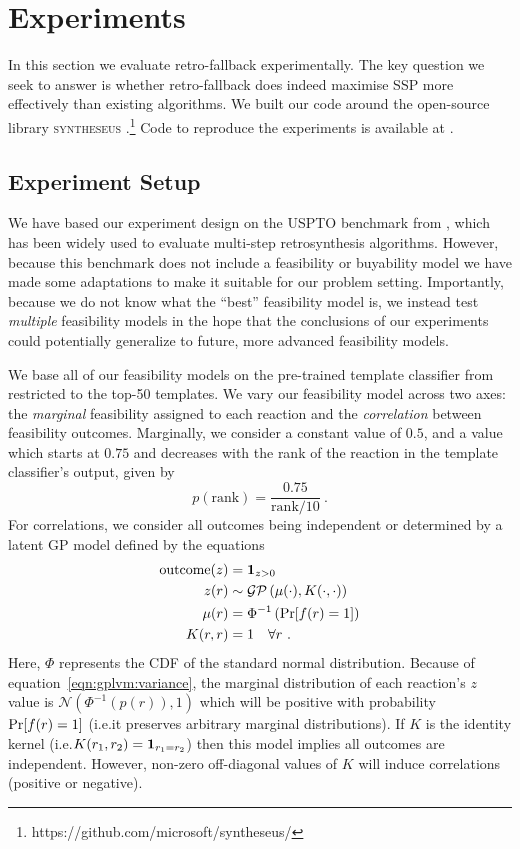 \section{Experiments}\label{sec:rfb:experiments}

In this section we evaluate retro-fallback experimentally.
The key question we seek to answer is whether retro-fallback does indeed maximise SSP
more effectively than existing algorithms.
We built our code around the open-source library \textsc{syntheseus}
\citep{maziarz2023re}.\footnote{
    https://github.com/microsoft/syntheseus/
}
Code to reproduce the experiments is available at \retrofallbackcodeurl{}.

\subsection{Experiment Setup}

We have based our experiment design on the USPTO benchmark from \citet{chen2020retro},
which has been widely used to evaluate multi-step retrosynthesis algorithms.
However, because this benchmark does not include a feasibility or buyability model
we have made some adaptations to make it suitable for our problem setting.
Importantly, because we do not know what the ``best'' feasibility model is, we instead
test \emph{multiple} feasibility models in the hope that the conclusions of our experiments
could potentially generalize to future, more advanced feasibility models.

We base all of our feasibility models on the pre-trained template classifier from \citet{chen2020retro}
restricted to the top-50 templates.
We vary our feasibility model across two axes: the \emph{marginal} feasibility assigned to each reaction
and the \emph{correlation} between feasibility outcomes.
Marginally, we consider a constant value of $0.5$,
and a value which starts at $0.75$ and decreases with the rank of the reaction
in the template classifier's output, given by
\begin{equation}
    p(\mathrm{rank}) = \frac{0.75}{\mathrm{rank}/10}\ .
\end{equation}
For correlations, we consider all outcomes being independent or determined by a latent GP model
defined by the equations
\begin{align}
    \mathrm{outcome}(z) &= \bm{1}_{z > 0} \\
    z(r) &\sim \mathcal{GP}\left(\mu(\cdot), K(\cdot, \cdot)\right) \\
    \mu(r) &= \Phi^{-1}\left(\Pr[f(r)=1]\right) \\
    K(r,r) &= 1 \quad\forall r \ .    \label{eqn:gplvm:variance} 
\end{align}
Here, $\Phi$ represents the CDF of the standard normal distribution.
Because of equation~\ref{eqn:gplvm:variance},
the marginal distribution of each reaction's $z$ value is $\mathcal{N}(\Phi^{-1}(p(r)), 1)$
which will be positive with probability $\Pr[f(r)=1]$
(i.e.\@ it preserves arbitrary marginal distributions).
If $K$ is the identity kernel (i.e.\@ $K(r_1,r_2)=\bm{1}_{r_1=r_2}$) then this model implies all outcomes are independent.
However, non-zero off-diagonal values of $K$ will induce correlations (positive or negative).

